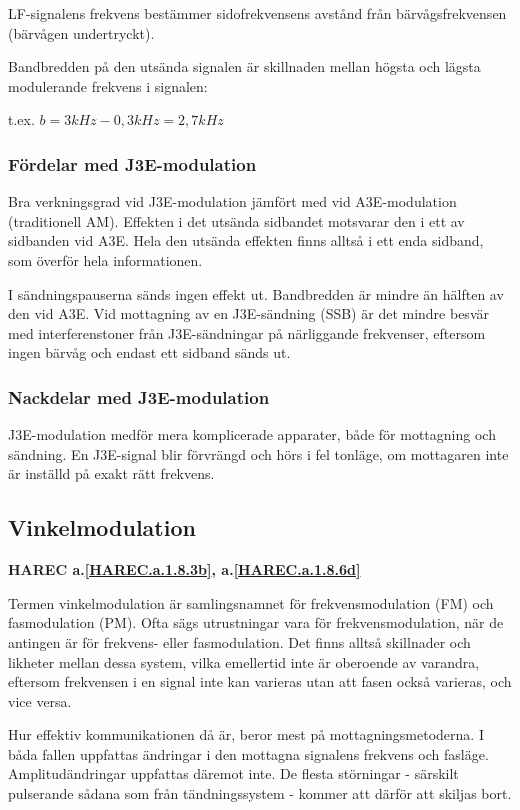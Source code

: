 LF-signalens frekvens bestämmer sidofrekvensens avstånd från bärvågsfrekvensen
(bärvågen undertryckt).

Bandbredden på den utsända signalen är skillnaden mellan högsta och lägsta
modulerande frekvens i signalen:

t.ex. \(b = 3kHz - 0,3 kHz = 2,7 kHz\)

\subsubsection{Fördelar med J3E-modulation}
Bra verkningsgrad vid J3E-modulation jämfört med vid A3E-modulation
(traditionell AM). Effekten i det utsända sidbandet motsvarar den i ett av
sidbanden vid A3E. Hela den utsända effekten finns alltså i ett enda sidband,
som överför hela informationen.

I sändningspauserna sänds ingen effekt ut. Bandbredden är mindre än hälften av
den vid A3E. Vid mottagning av en J3E-sändning (SSB) är det mindre besvär med
interferenstoner från J3E-sändningar på närliggande frekvenser, eftersom ingen
bärvåg och endast ett sidband sänds ut.

\subsubsection{Nackdelar med J3E-modulation}
J3E-modulation medför mera komplicerade apparater, både för mottagning och
sändning. En J3E-signal blir förvrängd och hörs i fel tonläge, om mottagaren
inte är inställd på exakt rätt frekvens.

\subsection{Vinkelmodulation}
\textbf{HAREC a.\ref{HAREC.a.1.8.3b}, a.\ref{HAREC.a.1.8.6d}\label{myHAREC.a.1.8.3b}\label{myHAREC.a.1.8.6d}}

Termen vinkelmodulation är samlingsnamnet för frekvensmodulation (FM) och
fasmodulation (PM). Ofta sägs utrustningar vara för frekvensmodulation, när de
antingen är för frekvens- eller fasmodulation. Det finns alltså skillnader och
likheter mellan dessa system, vilka emellertid inte är oberoende av varandra,
eftersom frekvensen i en signal inte kan varieras utan att fasen också
varieras, och vice versa.

Hur effektiv kommunikationen då är, beror mest på mottagningsmetoderna. I båda
fallen uppfattas ändringar i den mottagna signalens frekvens och fasläge.
Amplitudändringar uppfattas däremot inte. De flesta störningar - särskilt
pulserande sådana som från tändningssystem - kommer att därför att skiljas bort.

